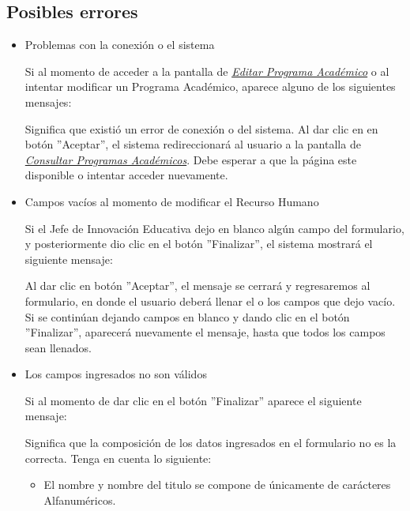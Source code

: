         \subsection{Posibles errores}

            \begin{itemize}
            	\item Problemas con la conexión o el sistema

                	Si al momento de acceder a la pantalla de \hyperlink{editarpa}{\textit{Editar Programa Académico}} o al intentar modificar un Programa Académico, aparece alguno de los siguientes mensajes:


                	Significa que existió un error de conexión o del sistema. Al dar clic en en botón ''Aceptar'', el sistema redireccionará al usuario a la pantalla de \hyperlink{consultarpa}{\textit{Consultar Programas Académicos}}. Debe esperar a que la página este disponible o intentar acceder nuevamente.

            	\item Campos vacíos al momento de modificar el Recurso Humano

                	Si el Jefe de Innovación Educativa dejo en blanco algún campo del formulario, y posteriormente dio clic en el botón ''Finalizar'', el sistema mostrará el siguiente mensaje:


            	    Al dar clic en botón ''Aceptar'', el mensaje se cerrará y regresaremos al formulario, en donde el usuario deberá llenar el o los campos que dejo vacío. Si se continúan dejando campos en blanco y dando clic en el botón ''Finalizar'', aparecerá nuevamente el mensaje, hasta que todos los campos sean llenados.

            	\item Los campos ingresados no son válidos

                	Si al momento de dar clic en el botón ''Finalizar'' aparece el siguiente mensaje:

                	Significa que la composición de los datos ingresados en el formulario no es la correcta. Tenga en cuenta lo siguiente:

                	\begin{itemize}
                		\item El nombre y nombre del titulo se compone de únicamente de carácteres Alfanuméricos.
                	\end{itemize}

            \end{itemize}
